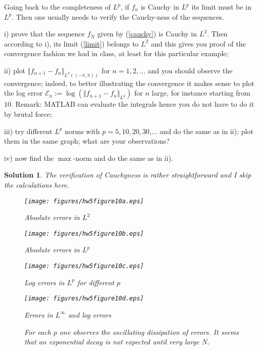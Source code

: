\documentclass[6pt]{article}
\newtheorem{solution}{Solution}
\numberwithin{equation}{section}
\begin{document}
\begin{enumerate}
Going back to the completeness of $L^p$, if $f_n$ is Cauchy in $L^p$ its limit must be in $L^p$.  Then one usually needs to verify the Cauchy-ness of the sequences.

i) prove that the sequence $f_N$ given by (\ref{cauchy}) is Cauchy in $L^2$.  Then according to i), its limit (\ref{limit}) belongs to $L^2$ and this gives you proof of the convergence fashion we had in class, at least for this particular example;

ii) plot $\Vert f_{n+1} -f_n \Vert_{L^2((-\pi,\pi))}$ for $n=1,2,...$ and you should observe the convergence; indeed, to better illustrating the convergence it makes sense to plot the log error $\mathcal E_n:=\log (\Vert f_{n+1} -f_n \Vert_{L^2})$ for $n$ large, for instance starting from $10$.  Remark: MATLAB can evaluate the integrals hence you do not have to do it by brutal force;

iii) try different $L^p$ norms with $p=5,10,20,30$,... and do the same as in ii); plot them in the same graph; what are your observations?

iv) now find the $\max$-norm and do the same as in ii).

\begin{solution}
The verification of Cauchyness is rather straightforward and I skip the calculations here.
\begin{figure}[h!]\vspace{-3mm}
\begin{minipage}{0.5\columnwidth}
\texttt{[image: figures/hw5figure10a.eps]}
\caption*{Absolute errors in $L^2$}
\end{minipage}
\begin{minipage}{0.5\columnwidth}
\texttt{[image: figures/hw5figure10b.eps]}
\caption*{Absolute errors in $L^p$}
\end{minipage}
\vspace{-1mm}\caption{ }\label{ }
\end{figure}

\begin{figure}[h!]\vspace{-3mm}
\begin{minipage}{0.5\columnwidth}
\texttt{[image: figures/hw5figure10c.eps]}
\caption*{Log errors in $L^p$ for different $p$}
\end{minipage}
\begin{minipage}{0.5\columnwidth}
\texttt{[image: figures/hw5figure10d.eps]}
\caption*{Errors in $L^\infty$ and log errors}
\end{minipage}
\vspace{-1mm}\caption{For each $p$ one observes the oscillating dissipation of errors.  It seems that an exponential decay is not expected until very large $N$.}
\end{figure}
\end{solution}




\end{enumerate}
\end{document}
